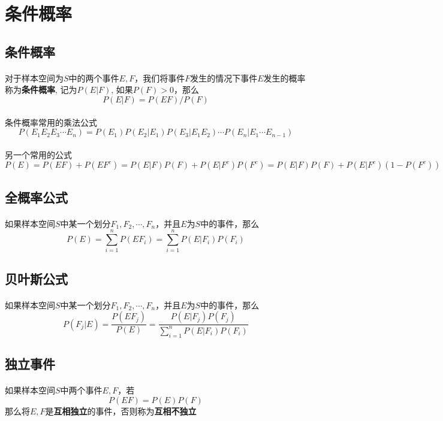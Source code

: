 \section{条件概率}

\subsection{条件概率}

\paragraph{}
对于样本空间为$S$中的两个事件$E, F$，我们将事件$F$发生的情况下事件$E$发生的概率称为\textbf{条件概率}, 记为$P(E|F)$, 如果$P(F) > 0$，那么
$$
P(E|F) = P(EF)/P(F)
$$

\paragraph{}
条件概率常用的乘法公式
$$
P(E_1E_2E_3\cdots E_n) = P(E_1)P(E_2|E_1)P(E_3|E_1 E_2)\cdots P(E_n|E_1\cdots E_{n-1})
$$

\paragraph{}
另一个常用的公式
$$
P(E) = P(EF) + P(EF^c) = P(E|F)P(F) + P(E|F^c)P(F^c) = P(E|F)P(F) + P(E|F^c)(1-P(F^c))
$$

\subsection{全概率公式}
\paragraph{}
如果样本空间$S$中某一个划分$F_1, F_2, \cdots, F_n$，并且$E$为$S$中的事件，那么
$$
P(E) = \sum_{i=1}^n P(EF_i) = \sum_{i=1}^n P(E|F_i) P(F_i) 
$$


\subsection{贝叶斯公式}
\paragraph{}
如果样本空间$S$中某一个划分$F_1, F_2, \cdots, F_n$，并且$E$为$S$中的事件，那么
$$
P(F_j|E) = \frac{P(EF_j)}{P(E)} = \frac{P(E|F_j)P(F_j)}{\sum_{i=1}^n P(E|F_i)P(F_i)}
$$

\subsection{独立事件}
\paragraph{}
如果样本空间$S$中两个事件$E, F$，若
$$
P(EF) = P(E)P(F)
$$
那么将$E, F$是\textbf{互相独立}的事件，否则称为\textbf{互相不独立}
